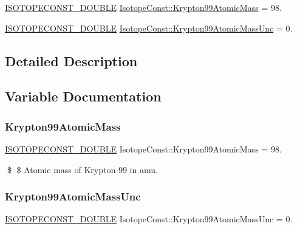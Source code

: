 \begin{DoxyCompactItemize}
\item 
\mbox{\hyperlink{group___isotope_const-_macros_ga8f45a7272ce02c0b4c65c44636ed719a}{I\+S\+O\+T\+O\+P\+E\+C\+O\+N\+S\+T\+\_\+\+D\+O\+U\+B\+LE}} \mbox{\hyperlink{group___isotope_const-_krypton-_kr99_ga6f6513c502ffb463b57812ef27c3ca8f}{Isotope\+Const\+::\+Krypton99\+Atomic\+Mass}} = 98.
\item 
\mbox{\hyperlink{group___isotope_const-_macros_ga8f45a7272ce02c0b4c65c44636ed719a}{I\+S\+O\+T\+O\+P\+E\+C\+O\+N\+S\+T\+\_\+\+D\+O\+U\+B\+LE}} \mbox{\hyperlink{group___isotope_const-_krypton-_kr99_ga11ec0d30d52041eddc3f3867a100b635}{Isotope\+Const\+::\+Krypton99\+Atomic\+Mass\+Unc}} = 0.
\end{DoxyCompactItemize}


\subsection{Detailed Description}


\subsection{Variable Documentation}
\mbox{\label{group___isotope_const-_krypton-_kr99_ga6f6513c502ffb463b57812ef27c3ca8f}} 
\subsubsection{\texorpdfstring{Krypton99\+Atomic\+Mass}{Krypton99AtomicMass}}
{\footnotesize\ttfamily \mbox{\hyperlink{group___isotope_const-_macros_ga8f45a7272ce02c0b4c65c44636ed719a}{I\+S\+O\+T\+O\+P\+E\+C\+O\+N\+S\+T\+\_\+\+D\+O\+U\+B\+LE}} Isotope\+Const\+::\+Krypton99\+Atomic\+Mass = 98.}

\$ \$ Atomic mass of Krypton-\/99 in amu. \mbox{\label{group___isotope_const-_krypton-_kr99_ga11ec0d30d52041eddc3f3867a100b635}} 
\subsubsection{\texorpdfstring{Krypton99\+Atomic\+Mass\+Unc}{Krypton99AtomicMassUnc}}
{\footnotesize\ttfamily \mbox{\hyperlink{group___isotope_const-_macros_ga8f45a7272ce02c0b4c65c44636ed719a}{I\+S\+O\+T\+O\+P\+E\+C\+O\+N\+S\+T\+\_\+\+D\+O\+U\+B\+LE}} Isotope\+Const\+::\+Krypton99\+Atomic\+Mass\+Unc = 0.}

